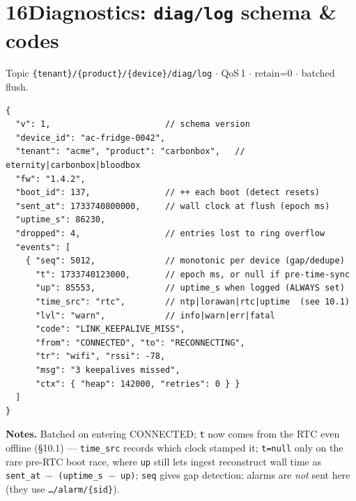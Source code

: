 \section*{16\quad Diagnostics: \texttt{diag/log} schema \& codes}
Topic \texttt{\{tenant\}/\{product\}/\{device\}/diag/log} $\cdot$ QoS\,1 $\cdot$ retain=0 $\cdot$ batched flush.

\begin{lstlisting}[style=js]
{
  "v": 1,                       // schema version
  "device_id": "ac-fridge-0042",
  "tenant": "acme", "product": "carbonbox",   // eternity|carbonbox|bloodbox
  "fw": "1.4.2",
  "boot_id": 137,               // ++ each boot (detect resets)
  "sent_at": 1733740800000,     // wall clock at flush (epoch ms)
  "uptime_s": 86230,
  "dropped": 4,                 // entries lost to ring overflow
  "events": [
    { "seq": 5012,              // monotonic per device (gap/dedupe)
      "t": 1733740123000,       // epoch ms, or null if pre-time-sync
      "up": 85553,              // uptime_s when logged (ALWAYS set)
      "time_src": "rtc",        // ntp|lorawan|rtc|uptime  (see 10.1)
      "lvl": "warn",            // info|warn|err|fatal
      "code": "LINK_KEEPALIVE_MISS",
      "from": "CONNECTED", "to": "RECONNECTING",
      "tr": "wifi", "rssi": -78,
      "msg": "3 keepalives missed",
      "ctx": { "heap": 142000, "retries": 0 } }
  ]
}
\end{lstlisting}
\noindent\textbf{Notes.} Batched on entering CONNECTED; \texttt{t} now comes from the RTC even
offline (\S10.1) — \texttt{time\_src} records which clock stamped it; \texttt{t=null} only on the
rare pre-RTC boot race, where \texttt{up} still lets ingest reconstruct wall time as
\texttt{sent\_at\,$-$\,(uptime\_s\,$-$\,up)}; \texttt{seq} gives gap detection; alarms are
\emph{not} sent here (they use \texttt{\dots /alarm/\{sid\}}).

